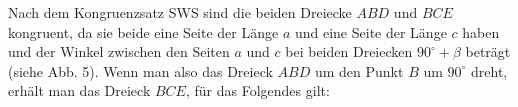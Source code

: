 \documentclass[a4paper,12pt]{article}
\begin{document}
\begin{figwindow}

Nach dem Kongruenzsatz SWS sind die beiden Dreiecke $ABD$ und $BCE$ kongruent, da sie beide eine Seite der Länge $a$ und eine Seite der Länge $c$ haben und der Winkel zwischen den Seiten $a$ und $c$ bei beiden Dreiecken $90^\circ + \beta$ beträgt (siehe Abb. 5). Wenn man also das Dreieck $ABD$ um den Punkt $B$ um $90^\circ$ dreht, erhält man das Dreieck $BCE$, für das Folgendes gilt:

\end{figwindow}
\end{document}
